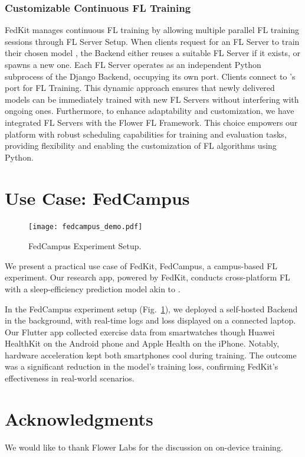 \documentclass[letterpaper]{article} %
\begin{document}
\subsubsection{Customizable Continuous FL Training}
FedKit manages continuous FL training by allowing multiple parallel FL training sessions
through FL Server Setup.
When clients request for an FL Server to
train their chosen model \model{},
the Backend either reuses a suitable FL Server \fs{} if it exists,
or spawns a new one.
Each FL Server
operates as an independent Python subprocess of the Django Backend,
occupying its own port.
Clients connect to \fs{}'s port for FL Training.
This dynamic approach ensures that
newly delivered models can be immediately trained with new FL Servers
without interfering with ongoing ones.
Furthermore, to enhance adaptability and customization, we have integrated FL Servers with the Flower FL Framework. This choice empowers our platform with robust scheduling capabilities for training and evaluation tasks, providing flexibility and enabling the customization of FL algorithms using Python.


\section{Use Case: FedCampus}

\begin{figure}
    \centering
    \texttt{[image: fedcampus\_demo.pdf]}
    \caption{FedCampus Experiment Setup.}
    \label{fig:fedcampus}
\end{figure}

We present a practical use case of FedKit, FedCampus,
a campus-based FL experiment.
Our research app, powered by FedKit,
conducts cross-platform FL with a sleep-efficiency prediction model
akin to \cite{khoa2022fedmcrnn}.

In the FedCampus experiment setup (Fig.~\ref{fig:fedcampus}),
we deployed a self-hosted Backend in the background,
with real-time logs and loss displayed on a connected laptop.
Our Flutter app collected exercise data from smartwatches
though Huawei HealthKit on the Android phone and Apple Health on the iPhone.
Notably, hardware acceleration kept both smartphones cool during training.
The outcome was a significant reduction in the model's training loss,
confirming FedKit's effectiveness in real-world scenarios.

\appendix

\section*{Acknowledgments}
We would like to thank Flower Labs for the discussion on on-device training.

\bigskip


\end{document}
